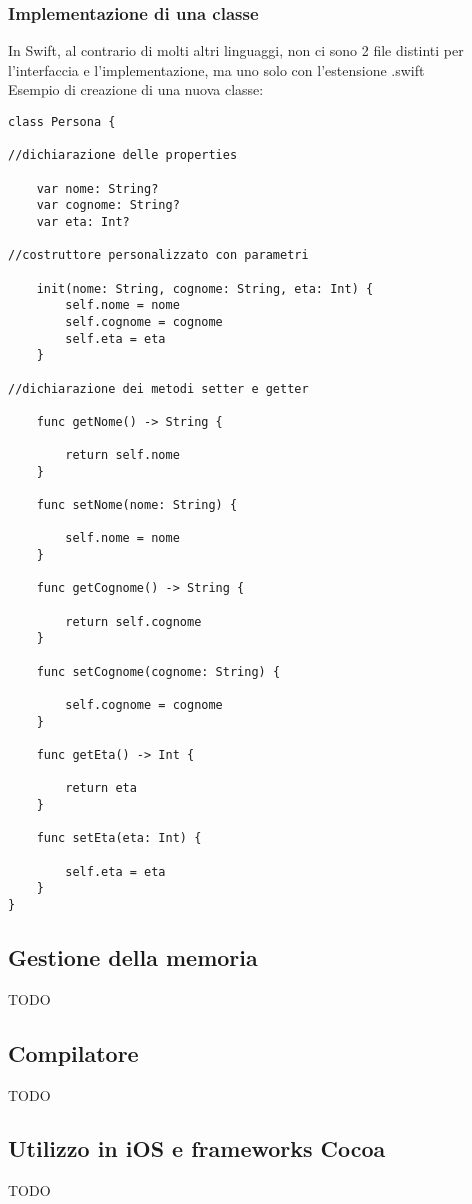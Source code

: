 \subsubsection{Implementazione di una classe}
In Swift, al contrario di molti altri linguaggi, non ci sono 2 file distinti per l'interfaccia e l'implementazione, ma uno solo con l'estensione .swift\\
Esempio di creazione di una nuova classe:\\
\begin{lstlisting}
class Persona { 

//dichiarazione delle properties

	var nome: String? 
	var cognome: String? 
	var eta: Int?

//costruttore personalizzato con parametri 

	init(nome: String, cognome: String, eta: Int) {
		self.nome = nome
		self.cognome = cognome
		self.eta = eta
	}

//dichiarazione dei metodi setter e getter 

	func getNome() -> String {

		return self.nome
	}

	func setNome(nome: String) {

		self.nome = nome
	}

	func getCognome() -> String {

		return self.cognome
	}

	func setCognome(cognome: String) {
	
		self.cognome = cognome
	}

	func getEta() -> Int {
	
		return eta
	}

	func setEta(eta: Int) {

		self.eta = eta
	}
}
\end{lstlisting}
\subsection{Gestione della memoria}
TODO
\subsection{Compilatore}
TODO
\subsection{Utilizzo in iOS e frameworks Cocoa}
TODO